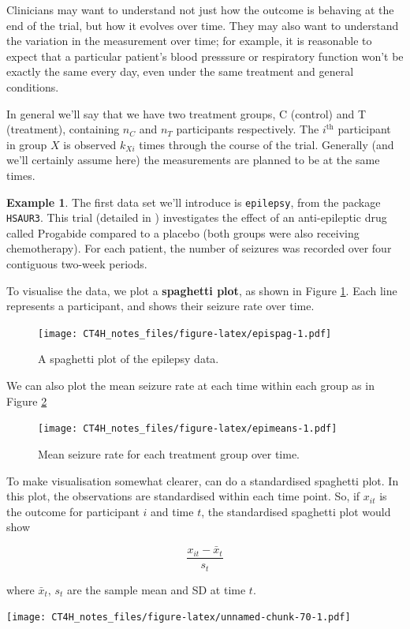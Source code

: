 \documentclass[
  openany]{book}
\theoremstyle{definition}
\theoremstyle{definition}
\newtheorem{example}{Example}[chapter]
\theoremstyle{definition}
\theoremstyle{definition}
\theoremstyle{remark}
\begin{document}
Clinicians may want to understand not just how the outcome is behaving at the end of the trial, but how it evolves over time. They may also want to understand the variation in the measurement over time; for example, it is reasonable to expect that a particular patient's blood presssure or respiratory function won't be exactly the same every day, even under the same treatment and general conditions.

In general we'll say that we have two treatment groups, C (control) and T (treatment), containing \(n_C\) and \(n_T\) participants respectively. The \(i^{\text{th}}\) participant in group \(X\) is observed \(k_{Xi}\) times through the course of the trial. Generally (and we'll certainly assume here) the measurements are planned to be at the same times.

\begin{example}
\protect\hypertarget{exm:epilepsy1}{}\label{exm:epilepsy1}The first data set we'll introduce is \texttt{epilepsy}, from the package \texttt{HSAUR3}. This trial (detailed in \citet{thall1990some}) investigates the effect of an anti-epileptic drug called Progabide compared to a placebo (both groups were also receiving chemotherapy). For each patient, the number of seizures was recorded over four contiguous two-week periods.

To visualise the data, we plot a \textbf{spaghetti plot}, as shown in Figure \ref{fig:epispag}. Each line represents a participant, and shows their seizure rate over time.

\begin{figure}
\centering
\texttt{[image: CT4H\_notes\_files/figure-latex/epispag-1.pdf]}
\caption{\label{fig:epispag}A spaghetti plot of the epilepsy data.}
\end{figure}

We can also plot the mean seizure rate at each time within each group as in Figure \ref{fig:epimeans}

\begin{figure}
\centering
\texttt{[image: CT4H\_notes\_files/figure-latex/epimeans-1.pdf]}
\caption{\label{fig:epimeans}Mean seizure rate for each treatment group over time.}
\end{figure}

To make visualisation somewhat clearer, can do a standardised spaghetti plot. In this plot, the observations are standardised within each time point. So, if \(x_{it}\) is the outcome for participant \(i\) and time \(t\), the standardised spaghetti plot would show

\[\frac{x_{it} - \bar{x}_t}{s_t} \]

where \(\bar{x}_t,\,s_t\) are the sample mean and SD at time \(t\).

\texttt{[image: CT4H\_notes\_files/figure-latex/unnamed-chunk-70-1.pdf]}
\end{example}
\end{document}
